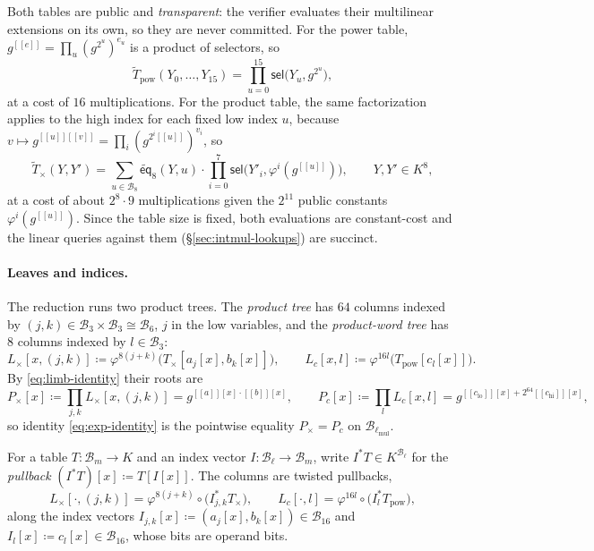 \documentclass{article}
\theoremstyle{definition}
\newcommand*{\mle}{\widetilde}
\newcommand{\eq}{\mathsf{eq}}
\newcommand{\BB}{\mathcal{B}}
\newcommand{\intval}[1]{[\![#1]\!]}
\newcommand{\sel}{\textsf{sel}}
\begin{document}
Both tables are public and \emph{transparent}: the verifier evaluates their multilinear extensions on its own, so they are never committed. For the power table, $g^{\intval{e}} = \prod_u (g^{2^u})^{e_u}$ is a product of selectors, so
\[
  \mle{T}_\text{pow}(Y_0, \ldots, Y_{15}) = \prod_{u = 0}^{15} \sel\bigl( Y_u, g^{2^u} \bigr),
\]
at a cost of $16$ multiplications. For the product table, the same factorization applies to the high index for each fixed low index $u$, because $v \mapsto g^{\intval{u} \intval{v}} = \prod_i (g^{2^i \intval{u}})^{v_i}$, so
\[
  \mle{T}_\times(Y, Y') = \sum_{u \in \BB_8} \mle{\eq}_8(Y, u) \cdot \prod_{i = 0}^{7} \sel\bigl( Y'_i, \varphi^i(g^{\intval{u}}) \bigr), \qquad Y, Y' \in K^8,
\]
at a cost of about $2^8 \cdot 9$ multiplications given the $2^{11}$ public constants $\varphi^i(g^{\intval{u}})$. Since the table size is fixed, both evaluations are constant-cost and the linear queries against them (\S\ref{sec:intmul-lookups}) are succinct.

\paragraph{Leaves and indices.}
The reduction runs two product trees. The \emph{product tree} has $64$ columns indexed by $(j, k) \in \BB_3 \times \BB_3 \cong \BB_6$, $j$ in the low variables, and the \emph{product-word tree} has $8$ columns indexed by $l \in \BB_3$:
\[
  L_\times[x, (j, k)] \coloneqq \varphi^{8(j + k)}\bigl( T_\times[a_j[x], b_k[x]] \bigr), \qquad L_c[x, l] \coloneqq \varphi^{16 l}\bigl( T_\text{pow}[c_l[x]] \bigr).
\]
By \eqref{eq:limb-identity} their roots are
\[
  P_\times[x] \coloneqq \prod_{j, k} L_\times[x, (j, k)] = g^{\intval{a}[x] \cdot \intval{b}[x]}, \qquad P_c[x] \coloneqq \prod_l L_c[x, l] = g^{\intval{c_\text{lo}}[x] + 2^{64} \intval{c_\text{hi}}[x]},
\]
so identity \eqref{eq:exp-identity} is the pointwise equality $P_\times = P_c$ on $\BB_{\ell_\text{mul}}$.

For a table $T \colon \BB_m \to K$ and an index vector $I \colon \BB_\ell \to \BB_m$, write $I^* T \in K^{\BB_\ell}$ for the \emph{pullback} $(I^* T)[x] \coloneqq T[I[x]]$. The columns are twisted pullbacks,
\[
  L_\times[\cdot, (j, k)] = \varphi^{8(j + k)} \circ \bigl( I_{j, k}^* T_\times \bigr), \qquad L_c[\cdot, l] = \varphi^{16 l} \circ \bigl( I_l^* T_\text{pow} \bigr),
\]
along the index vectors $I_{j, k}[x] \coloneqq (a_j[x], b_k[x]) \in \BB_{16}$ and $I_l[x] \coloneqq c_l[x] \in \BB_{16}$, whose bits are operand bits.
\end{document}

